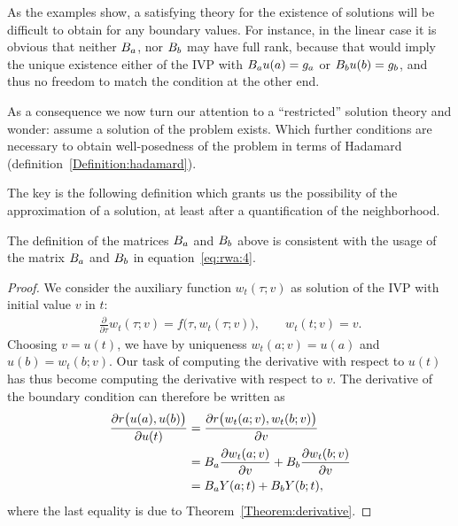 \begin{remark}
  As the examples show, a satisfying theory for the existence of
  solutions will be difficult to obtain for any boundary values. For
  instance, in the linear case it is obvious that neither $B_a$, nor
  $B_b$ may have full rank, because that would imply the unique
  existence either of the IVP with $B_a u(a) = g_a$ or
  $B_b u(b) = g_b$, and thus no freedom to match the condition at
  the other end.

  As a consequence we now turn our attention to a ``restricted''
  solution theory and wonder: assume a solution of the problem
  exists. Which further conditions are necessary to obtain
  well-posedness of the problem in terms of Hadamard
  (definition~\vref{Definition:hadamard}).

  The key is the following definition which grants us the possibility
  of the approximation of a solution, at least after a quantification
  of the neighborhood.
\end{remark}




\begin{remark}
  The definition of the matrices $B_a$ and $B_b$ above is
  consistent with the usage of the matrix $B_a$ and $B_b$ in
  equation~\eqref{eq:rwa:4}.
\end{remark}

\begin{proof}
  We consider the auxiliary function $w_t(\tau;v)$ as solution of the
  IVP with initial value $v$ in $t$:
  \begin{gather*}
    \frac{\partial}{\partial \tau} w_t(\tau;v)
    = f\bigl(\tau,w_t(\tau;v)\bigr), \qquad w_t(t;v) = v.
  \end{gather*}
  Choosing $v=u(t)$, we have by uniqueness $w_t(a;v) = u(a)$ and
  $u(b) = w_t(b;v)$. Our task of computing the derivative with respect
  to $u(t)$ has thus become computing the derivative with respect to
  $v$. The derivative of the boundary condition can therefore be
  written as
  \begin{align*}
    \frac{\partial r\bigl(u(a),u(b)\bigr)}{\partial u(t)}
    &=
    \frac{\partial r\bigl(w_t(a;v),w_t(b;v)\bigr)}{\partial v}
    \\
    &= \rwaa \frac{\partial w_t(a;v)}{\partial v}
    + \rwab \frac{\partial w_t(b;v)}{\partial v}
    \\
    &= \rwaa \fundamental(a;t) + \rwab \fundamental(b;t),
  \end{align*}
  where the last equality is due to Theorem~\ref{Theorem:derivative}.
\end{proof}

